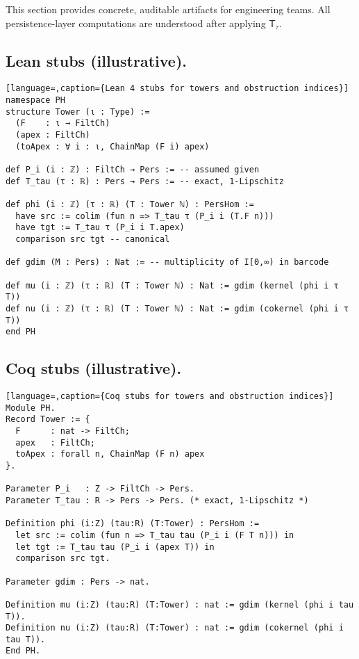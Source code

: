 \documentclass[11pt]{article}
\numberwithin{equation}{section}
\theoremstyle{plain}
\theoremstyle{definition}
\theoremstyle{remark}
\newcommand{\T}{\mathsf{T}}
\theoremstyle{plain}
\theoremstyle{definition}
\numberwithin{equation}{section}
\theoremstyle{definition}
\numberwithin{equation}{section}
\theoremstyle{plain}
\theoremstyle{definition}
\theoremstyle{remark}
\begin{document}
This section provides concrete, auditable artifacts for engineering teams. All persistence-layer computations are understood after applying \(\T_\tau\).

\subsection*{Lean stubs (illustrative).}
\begin{lstlisting}[language=,caption={Lean 4 stubs for towers and obstruction indices}]
namespace PH
structure Tower (ι : Type) :=
  (F    : ι → FiltCh)
  (apex : FiltCh)
  (toApex : ∀ i : ι, ChainMap (F i) apex)

def P_i (i : ℤ) : FiltCh → Pers := -- assumed given
def T_tau (τ : ℝ) : Pers → Pers := -- exact, 1-Lipschitz

def phi (i : ℤ) (τ : ℝ) (T : Tower ℕ) : PersHom :=
  have src := colim (fun n => T_tau τ (P_i i (T.F n)))
  have tgt := T_tau τ (P_i i T.apex)
  comparison src tgt -- canonical

def gdim (M : Pers) : Nat := -- multiplicity of I[0,∞) in barcode

def mu (i : ℤ) (τ : ℝ) (T : Tower ℕ) : Nat := gdim (kernel (phi i τ T))
def nu (i : ℤ) (τ : ℝ) (T : Tower ℕ) : Nat := gdim (cokernel (phi i τ T))
end PH
\end{lstlisting}

\subsection*{Coq stubs (illustrative).}
\begin{lstlisting}[language=,caption={Coq stubs for towers and obstruction indices}]
Module PH.
Record Tower := {
  F      : nat -> FiltCh;
  apex   : FiltCh;
  toApex : forall n, ChainMap (F n) apex
}.

Parameter P_i   : Z -> FiltCh -> Pers.
Parameter T_tau : R -> Pers -> Pers. (* exact, 1-Lipschitz *)

Definition phi (i:Z) (tau:R) (T:Tower) : PersHom :=
  let src := colim (fun n => T_tau tau (P_i i (F T n))) in
  let tgt := T_tau tau (P_i i (apex T)) in
  comparison src tgt.

Parameter gdim : Pers -> nat.

Definition mu (i:Z) (tau:R) (T:Tower) : nat := gdim (kernel (phi i tau T)).
Definition nu (i:Z) (tau:R) (T:Tower) : nat := gdim (cokernel (phi i tau T)).
End PH.
\end{lstlisting}
\end{document}
